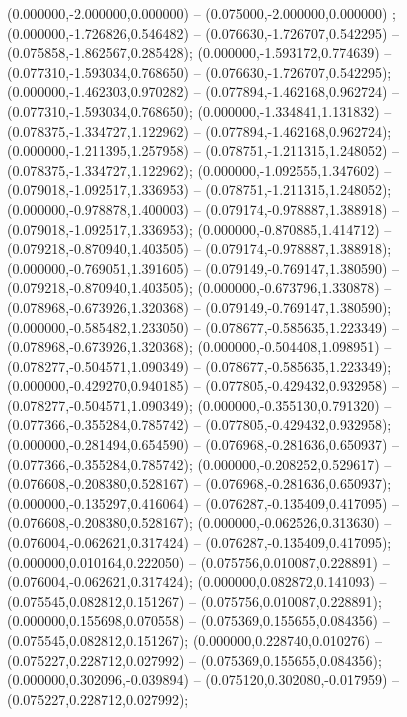 (0.000000,-2.000000,0.000000) -- (0.075000,-2.000000,0.000000) ;
 (0.000000,-1.726826,0.546482) -- (0.076630,-1.726707,0.542295) -- (0.075858,-1.862567,0.285428);
 (0.000000,-1.593172,0.774639) -- (0.077310,-1.593034,0.768650) -- (0.076630,-1.726707,0.542295);
 (0.000000,-1.462303,0.970282) -- (0.077894,-1.462168,0.962724) -- (0.077310,-1.593034,0.768650);
 (0.000000,-1.334841,1.131832) -- (0.078375,-1.334727,1.122962) -- (0.077894,-1.462168,0.962724);
 (0.000000,-1.211395,1.257958) -- (0.078751,-1.211315,1.248052) -- (0.078375,-1.334727,1.122962);
 (0.000000,-1.092555,1.347602) -- (0.079018,-1.092517,1.336953) -- (0.078751,-1.211315,1.248052);
 (0.000000,-0.978878,1.400003) -- (0.079174,-0.978887,1.388918) -- (0.079018,-1.092517,1.336953);
 (0.000000,-0.870885,1.414712) -- (0.079218,-0.870940,1.403505) -- (0.079174,-0.978887,1.388918);
 (0.000000,-0.769051,1.391605) -- (0.079149,-0.769147,1.380590) -- (0.079218,-0.870940,1.403505);
 (0.000000,-0.673796,1.330878) -- (0.078968,-0.673926,1.320368) -- (0.079149,-0.769147,1.380590);
 (0.000000,-0.585482,1.233050) -- (0.078677,-0.585635,1.223349) -- (0.078968,-0.673926,1.320368);
 (0.000000,-0.504408,1.098951) -- (0.078277,-0.504571,1.090349) -- (0.078677,-0.585635,1.223349);
 (0.000000,-0.429270,0.940185) -- (0.077805,-0.429432,0.932958) -- (0.078277,-0.504571,1.090349);
 (0.000000,-0.355130,0.791320) -- (0.077366,-0.355284,0.785742) -- (0.077805,-0.429432,0.932958);
 (0.000000,-0.281494,0.654590) -- (0.076968,-0.281636,0.650937) -- (0.077366,-0.355284,0.785742);
 (0.000000,-0.208252,0.529617) -- (0.076608,-0.208380,0.528167) -- (0.076968,-0.281636,0.650937);
 (0.000000,-0.135297,0.416064) -- (0.076287,-0.135409,0.417095) -- (0.076608,-0.208380,0.528167);
 (0.000000,-0.062526,0.313630) -- (0.076004,-0.062621,0.317424) -- (0.076287,-0.135409,0.417095);
 (0.000000,0.010164,0.222050) -- (0.075756,0.010087,0.228891) -- (0.076004,-0.062621,0.317424);
 (0.000000,0.082872,0.141093) -- (0.075545,0.082812,0.151267) -- (0.075756,0.010087,0.228891);
 (0.000000,0.155698,0.070558) -- (0.075369,0.155655,0.084356) -- (0.075545,0.082812,0.151267);
 (0.000000,0.228740,0.010276) -- (0.075227,0.228712,0.027992) -- (0.075369,0.155655,0.084356);
 (0.000000,0.302096,-0.039894) -- (0.075120,0.302080,-0.017959) -- (0.075227,0.228712,0.027992);
